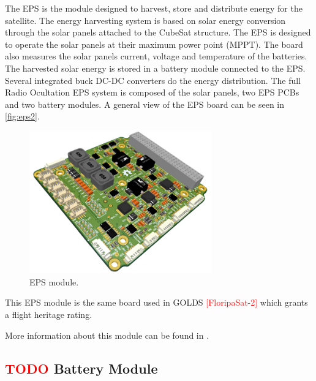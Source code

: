 The EPS is the module designed to harvest, store and distribute energy for the satellite. The energy harvesting system is based on solar energy conversion through the solar panels attached to the CubeSat structure. The EPS is designed to operate the solar panels at their maximum power point (MPPT). The board also measures the solar panels current, voltage and temperature of the batteries. The harvested solar energy is stored in a battery module connected to the EPS. Several integrated buck DC-DC converters do the energy distribution. The full Radio Ocultation EPS system is composed of the solar panels, two EPS PCBs and two battery modules. A general view of the EPS board can be seen in \autoref{fig:eps2}.

\begin{figure}[!ht]
    \begin{center}
        \includegraphics[width=0.7\textwidth]{figures/subsystems/eps2-pcb-3d}
        \caption{EPS module.}
        \label{fig:eps2}
    \end{center}
\end{figure}

This EPS module is the same board used in GOLDS \textcolor{red}{[FloripaSat-2]} which grants a flight heritage rating. %

More information about this module can be found in \cite{eps2}.

\subsection{ \textcolor{red}{TODO} Battery Module} \label{ssec:battery-module}

